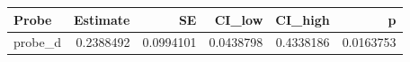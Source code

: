 
\begin{tabular}[t]{lrrrrr}
\toprule
Probe & Estimate & SE & CI\_low & CI\_high & p\\
\midrule
probe\_d & 0.2388492 & 0.0994101 & 0.0438798 & 0.4338186 & 0.0163753\\
\bottomrule
\end{tabular}

